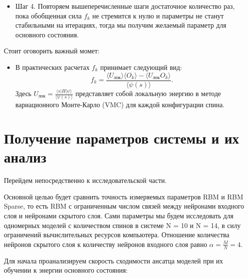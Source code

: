     \begin{itemize}
        \item Шаг 4. Повторяем вышеперечисленные шаги достаточное количество раз, пока обобщенная сила $f_k$ не стремится к нулю и параметры не станут стабильными на итерациях, тогда мы получим желаемый параметр для основного состояния.
    \end{itemize}
    
    Стоит оговорить  важный момет:
    \begin{itemize}
        \item В практических расчетах \(f_k\) принимает следующий вид:
        \[
        f_k = \frac{\langle U_{\text{лок}} \rangle \langle O_k \rangle - \langle U_{\text{лок}} O_k \rangle}{\langle \psi(s) \rangle}. \tag{23}
        \]
        Здесь \(U_{\text{лок}} = \frac{\langle s|H|\psi \rangle}{\langle \psi(s) \rangle}\) представляет собой локальную энергию в методе вариационного Монте-Карло (VMC) для каждой конфигурации спина.
    \end{itemize}


\section{Получение параметров системы и их анализ}

Перейдем непосредственно к исследовательской части.

Основной целью будет сравнить точность измеряемых параметров RBM и RBM Sparse, то есть RBM с ограниченным числом связей между нейронами входного слоя и нейронами скрытого слоя. Сами параметры мы будем исследовать для одномерных моделей с количеством спинов в системе N = 10 и N = 14, в силу ограничений вычислительных  ресурсов компьютера. 
Отношение количества нейронов скрытого слоя к количеству нейронов входного слоя  равно \(\alpha = \frac{M}{N} = 4 \).


Для начала проанализируем скорость сходимости ансатца моделей при их обучении к энергии основного состояния:

